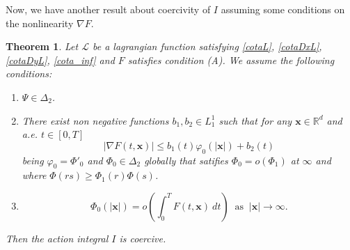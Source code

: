 \documentclass[twoside]{article}
\newtheorem{thm}{Theorem}[section]
\theoremstyle{remark}
\renewcommand{\b}[1]{\boldsymbol{#1}}
\newcommand{\rr}{\mathbb{R}}
\renewcommand{\leq}{\leqslant}
\begin{document}
Now, we have another result about coercivity of $I$ assuming some conditions on the nonlinearity  $\nabla F$. 












\begin{thm}\label{coercitividad-r}
Let  $\mathcal{L}$ be a lagrangian function satisfying \eqref{cotaL}, \eqref{cotaDxL}, \eqref{cotaDyL}, \eqref{cota_inf}  and $F$ satisfies condition (A). We assume the following conditions:
\begin{enumerate}
\item $\Psi\in\Delta_2$.
\item There exist  non negative functions  $b_1,b_2 \in L^1_1$ 
such that
for any $\b{x}\in\rr^d$ and a.e. $t\in [0,T]$
\begin{equation}\label{holder_cont-mu}
  \left| \nabla F(t,\b{x}) \right|\leq b_1(t)\varphi_0(|\b{x}|)+b_2(t)
\end{equation}
being  $\varphi_0=\Phi'_0$ and $\Phi_0 \in \Delta_2$ globally that satifies 
$\Phi_0=o(\Phi_1)$ at $\infty$ and where $\Phi(rs)\geq \Phi_1(r)\Phi(s)$.
\item 
\begin{equation}\label{propiedad-coercividad-sigma}
\Phi_0(|\b{x}|)=o\left(\int_{0}^{T}F(t,\b{x})\ dt\right)\;\;\mbox{as}\;\;|\b{x}|\to \infty.
\end{equation}
\end{enumerate}
Then  the action integral $I$ is coercive.
\end{thm}
\end{document}
